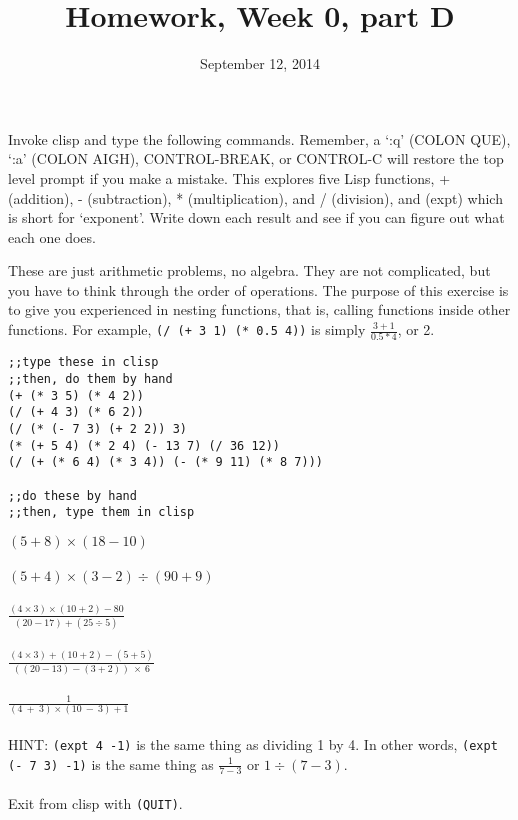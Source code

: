 \documentclass{article}
\title{Homework, Week 0, part D}
\date{September 12, 2014}
\begin{document}
\maketitle{}
\lstset{language=Lisp}

Invoke clisp and type the following commands. Remember, a `:q' (COLON QUE), `:a' (COLON AIGH), CONTROL-BREAK, or CONTROL-C will restore the top level prompt if you make a mistake. This explores five Lisp functions, + (addition), - (subtraction), * (multiplication), and / (division), and (expt) which is short for `exponent'. Write down each result and see if you can figure out what each one does.

These are just arithmetic problems, no algebra. They are not complicated, but you have to think through the order of operations. The purpose of this exercise is to give you experienced in nesting functions, that is, calling functions inside other functions. For example, \texttt{(/ (+ 3 1) (* 0.5 4))} is simply $\frac{3 + 1}{0.5 * 4}$, or 2.

\begin{lstlisting}
;;type these in clisp
;;then, do them by hand
(+ (* 3 5) (* 4 2))
(/ (+ 4 3) (* 6 2))
(/ (* (- 7 3) (+ 2 2)) 3)
(* (+ 5 4) (* 2 4) (- 13 7) (/ 36 12))
(/ (+ (* 6 4) (* 3 4)) (- (* 9 11) (* 8 7)))

;;do these by hand
;;then, type them in clisp
\end{lstlisting}
$(5 + 8) \times (18 - 10)$ \\
\\
$(5 + 4) \times (3 - 2) \div (90 + 9)$\\
\\
$\frac{(4 \times 3) \times (10 + 2) - 80}{(20 - 17) + (25 \div 5)}$ \\
\\
$\frac{(4 \times 3) + (10 + 2) - (5 + 5)}{((20 - 13) - (3 + 2)) \: \times \: 6}$ \\
\\
$\frac{1}{( 4 \: + \: 3) \times (10 \:- \:    3) + 1}$ \\
\\
HINT: \texttt{(expt 4 -1)} is the same thing as dividing 1 by 4. In other words, \texttt{(expt (- 7 3) -1)} is the same thing as $\frac{1}{7 - 3}$ or $1 \div (7 - 3)$. \\


\paragraph{}Exit from clisp with \texttt{(QUIT)}.
\end{document}
